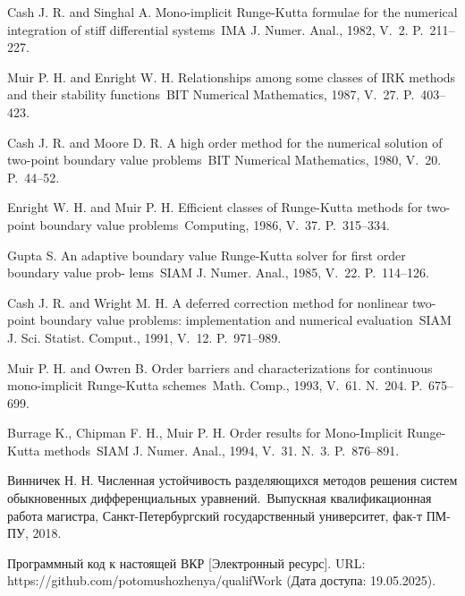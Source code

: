\documentclass[a4paper,article,14pt]{extarticle}
\begin{document}
\begin{thebibliography}{1}
 Cash J. R. and Singhal A. \flqq Mono-implicit Runge-Kutta formulae for the numerical integration of stiff differential systems\frqq~IMA J. Numer. Anal., 1982, V.~2. P.~211--227.

 Muir P. H. and Enright W. H. \flqq Relationships among some classes of IRK methods and their stability functions\frqq~BIT Numerical Mathematics, 1987, V.~27. P.~403--423.

 Cash J. R. and Moore D. R. \flqq A high order method for the numerical solution of two-point boundary value problems\frqq~BIT Numerical Mathematics, 1980, V.~20. P.~44--52.

 Enright W. H. and Muir P. H. \flqq Efficient classes of Runge-Kutta methods for two-point boundary value problems\frqq~Computing, 1986, V.~37. P.~315--334.

 Gupta S. \flqq An adaptive boundary value Runge-Kutta solver for first order boundary value prob-
lems\frqq~SIAM J. Numer. Anal., 1985, V.~22. P.~114--126.

 Cash J. R. and Wright M. H. \flqq A deferred correction method for nonlinear two-point boundary
value problems: implementation and numerical evaluation\frqq~SIAM J. Sci. Statist. Comput., 1991, V.~12. P.~971--989.

 Muir P. H. and Owren B. \flqq Order barriers and characterizations for continuous mono-implicit
Runge-Kutta schemes\frqq~Math. Comp., 1993, V.~61. N.~204. P.~675--699.

 Burrage K., Chipman F. H., Muir P. H. \flqq Order results for Mono-Implicit Runge-Kutta methods\frqq~SIAM J. Numer. Anal., 1994, V.~31. N.~3. P.~876--891.

 Винничек Н. Н. \flqq Численная устойчивость разделяющихся методов решения систем обыкновенных дифференциальных уравнений.\frqq~Выпускная квалификационная работа магистра, Санкт-Петербургский государственный университет, фак-т ПМ-ПУ, 2018.

 Программный код к настоящей ВКР [Электронный ресурс]. URL: https://github.com/potomushozhenya/qualifWork (Дата доступа: 19.05.2025).

\end{thebibliography}
\end{document}
